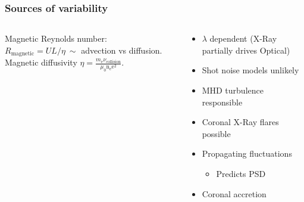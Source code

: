 \documentclass[hyperref={pdfpagelabels=false}]{beamer}
\begin{document}

\begin{frame}
\frametitle{Sources of variability}
  \begin{columns}
    \begin{column}{0.5\textwidth}
      \begin{center}
        \centering
      \end{center}
      \begin{center}
        \centering
        {\tiny \citet{ArmitageReynolds03}}
      \end{center}
      Magnetic Reynolds number: $R_{\mathrm{magnetic}} = UL/\eta \ \sim$ advection vs diffusion. \\
      Magnetic diffusivity $\eta = \frac{m_{\mathrm{e}}\nu_{\mathrm{collision}}}{\mu_{0}\mathrm{n}_{\mathrm{e}}\mathrm{e}^{2}}$.
    \end{column}
    \begin{column}{0.5\textwidth}
      \begin{itemize}
        \item $\lambda$ dependent (X-Ray partially drives Optical) {\tiny \citep{UttleyAccretion}}
        \item Shot noise models unlikely {\tiny \citep{UMV05}}
        \item MHD turbulence responsible {\tiny \citep{NowakWagoner95}}
        \item Coronal X-Ray flares possible {\tiny \citep{PoutanenFabian99}}
        \item Propagating fluctuations {\tiny \citep{Lyubarskii97}}
          \begin{itemize}
            \item Predicts PSD
          \end{itemize}
        \item Coronal accretion {\tiny \citep{JaniukCzerny07}}
      \end{itemize}
    \end{column}
  \end{columns}
\end{frame}
\end{document}
